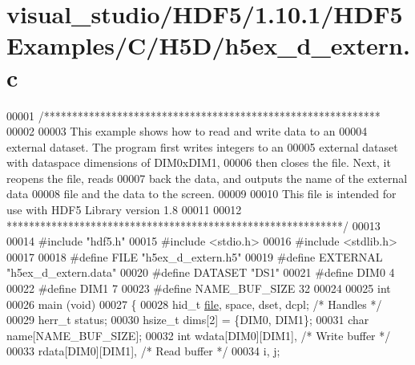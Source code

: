 \hypertarget{visual__studio_2_h_d_f5_21_810_81_2_h_d_f5_examples_2_c_2_h5_d_2h5ex__d__extern_8c_source}{}\section{visual\+\_\+studio/\+H\+D\+F5/1.10.1/\+H\+D\+F5\+Examples/\+C/\+H5\+D/h5ex\+\_\+d\+\_\+extern.c}
\label{visual__studio_2_h_d_f5_21_810_81_2_h_d_f5_examples_2_c_2_h5_d_2h5ex__d__extern_8c_source}

\begin{DoxyCode}
00001 \textcolor{comment}{/************************************************************}
00002 \textcolor{comment}{}
00003 \textcolor{comment}{  This example shows how to read and write data to an}
00004 \textcolor{comment}{  external dataset.  The program first writes integers to an}
00005 \textcolor{comment}{  external dataset with dataspace dimensions of DIM0xDIM1,}
00006 \textcolor{comment}{  then closes the file.  Next, it reopens the file, reads}
00007 \textcolor{comment}{  back the data, and outputs the name of the external data}
00008 \textcolor{comment}{  file and the data to the screen.}
00009 \textcolor{comment}{}
00010 \textcolor{comment}{  This file is intended for use with HDF5 Library version 1.8}
00011 \textcolor{comment}{}
00012 \textcolor{comment}{ ************************************************************/}
00013 
00014 \textcolor{preprocessor}{#include "hdf5.h"}
00015 \textcolor{preprocessor}{#include <stdio.h>}
00016 \textcolor{preprocessor}{#include <stdlib.h>}
00017 
00018 \textcolor{preprocessor}{#define FILE            "h5ex\_d\_extern.h5"}
00019 \textcolor{preprocessor}{#define EXTERNAL        "h5ex\_d\_extern.data"}
00020 \textcolor{preprocessor}{#define DATASET         "DS1"}
00021 \textcolor{preprocessor}{#define DIM0            4}
00022 \textcolor{preprocessor}{#define DIM1            7}
00023 \textcolor{preprocessor}{#define NAME\_BUF\_SIZE   32}
00024 
00025 \textcolor{keywordtype}{int}
00026 main (\textcolor{keywordtype}{void})
00027 \{
00028     hid\_t       \hyperlink{structfile}{file}, space, dset, dcpl;    \textcolor{comment}{/* Handles */}
00029     herr\_t      status;
00030     hsize\_t     dims[2] = \{DIM0, DIM1\};
00031     \textcolor{keywordtype}{char}        name[NAME\_BUF\_SIZE];
00032     \textcolor{keywordtype}{int}         wdata[DIM0][DIM1],          \textcolor{comment}{/* Write buffer */}
00033                 rdata[DIM0][DIM1],          \textcolor{comment}{/* Read buffer */}
00034                 i, j;

\end{DoxyCode}

